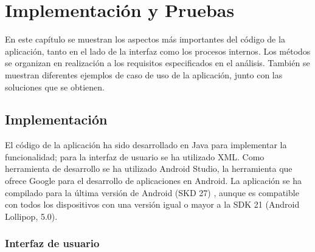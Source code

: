 \chapter{Implementación y Pruebas}
En este capítulo se muestran los aspectos más importantes del código de la aplicación, tanto en el lado de la interfaz como los procesos internos. Los métodos se organizan en realización a los requisitos especificados en el análisis. También se muestran diferentes ejemplos de caso de uso de la aplicación, junto con las soluciones que se obtienen.
\section{Implementación}
El código de la aplicación ha sido desarrollado en Java para implementar la funcionalidad; para la interfaz de usuario se ha utilizado XML. Como herramienta de desarrollo se ha utilizado Android Studio, la herramienta que ofrece Google para el desarrollo de aplicaciones en Android. La aplicación se ha compilado para la última versión de Android (SKD 27) \cite{sdk-27}, aunque es compatible con todos los dispositivos con una versión igual o mayor a la SDK 21 (Android Lollipop, 5.0).

\subsection[Interfaz de usuario]{Interfaz de usuario}
